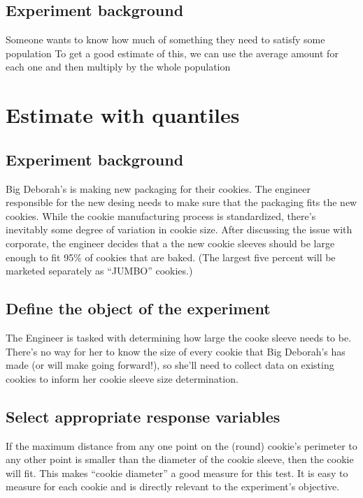 \documentclass[]{book}
\begin{document}
\subsection{Experiment background}\label{experiment-background-2}

Someone wants to know how much of something they need to satisfy some
population To get a good estimate of this, we can use the average amount
for each one and then multiply by the whole population

\section{Estimate with quantiles}\label{estimate-with-quantiles}

\subsection{Experiment background}\label{experiment-background-3}

Big Deborah's is making new packaging for their cookies. The engineer
responsible for the new desing needs to make sure that the packaging
fits the new cookies. While the cookie manufacturing process is
standardized, there's inevitably some degree of variation in cookie
size. After discussing the issue with corporate, the engineer decides
that a the new cookie sleeves should be large enough to fit 95\% of
cookies that are baked. (The largest five percent will be marketed
separately as ``JUMBO'' cookies.)

\subsection{Define the object of the
experiment}\label{define-the-object-of-the-experiment}

The Engineer is tasked with determining how large the cooke sleeve needs
to be. There's no way for her to know the size of every cookie that Big
Deborah's has made (or will make going forward!), so she'll need to
collect data on existing cookies to inform her cookie sleeve size
determination.

\subsection{Select appropriate response
variables}\label{select-appropriate-response-variables}

If the maximum distance from any one point on the (round) cookie's
perimeter to any other point is smaller than the diameter of the cookie
sleeve, then the cookie will fit. This makes ``cookie diameter'' a good
measure for this test. It is easy to measure for each cookie and is
directly relevant to the experiment's objective.
\end{document}
